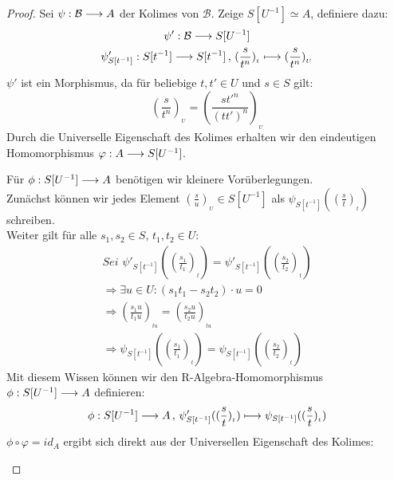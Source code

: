 \documentclass[10pt,a4paper]{report}
\newcommand{\comment}[1]{}
\newcommand{\functionfront}[3]{\nolinebreak{#1:#2 \longrightarrow #3}}
\newcommand{\function}[5]{\nolinebreak{#1:#2 \longrightarrow #3 \, , \, #4 \longmapsto #5}}
\newcommand{\lok}[2]{#1 [#2^{-1}]}
\newcommand{\loke}[3]{(\frac{#1}{#2})_{_{#3}}}
\begin{document}
\begin{proof}
Sei $\functionfront{\psi}{\mathcal{B}}{A}$ der Kolimes von $\mathcal{B}$. Zeige $\lok{S}{U} \simeq A$, definiere dazu:
\begin{gather*}
\functionfront{\psi'}{\mathcal{B}}{\lok{S}{U}}\\
\function{\psi'_{\lok{S}{t}}}{\lok{S}{t}}{\lok{S}{t}}{\loke{s}{t^n}{t}}{\loke{s}{t^n}{U}}
\end{gather*}
$\psi'$ ist ein Morphismus, da für beliebige $t,t' \in U$ und $s \in S$ gilt:
$$\loke{s}{t^n}{U} = \loke{st'^n}{(tt')^n}{U}$$
Durch die Universelle Eigenschaft des Kolimes erhalten wir den eindeutigen Homomorphismus $\functionfront{\varphi}{A}{\lok{S}{U}}$.
\begin{center}
\end{center}
Für $\functionfront{\phi}{S[U^{-1}]}{A}$ benötigen wir kleinere Vorüberlegungen.\\
Zunächst können wir jedes Element $\loke{s}{u}{U} \in \lok{S}{U}$ als $\psi_{\lok{S}{t}}(\loke{s}{t}{t})$ schreiben.\\
\comment{\label{wobei u = t}}
Weiter gilt für alle $s_1,s_2 \in S , \, t_1,t_2 \in U$: 
\begin{align*}
\textit{Sei }\psi'_{\lok{S}{t}}(\loke{s_1}{t_1}{t}) = \psi'_{\lok{S}{t}}(\loke{s_2}{t_2}{t})\\
\Rightarrow  \exists u \in U: (s_1t_1 - s_2t_2) \cdot u = 0\\
\Rightarrow  \loke{s_1u}{t_1u}{tu} = \loke{s_2u}{t_2u}{tu}\\
\Rightarrow  \psi_{\lok{S}{t}}(\loke{s_1}{t_1}{t}) = \psi_{\lok{S}{t}}(\loke{s_2}{t_2}{t})
\end{align*}
Mit diesem Wissen können wir den R-Algebra-Homomorphismus $\functionfront{\phi}{\lok{S}{U}}{A}$ definieren:
\begin{gather*}
\function{\phi}{\lok{S}{U}}{A}{\psi'_{\lok{S}{t}}(\loke{s}{t}{t})}{\psi_{\lok{S}{t}}(\loke{s}{t}{t})}
\end{gather*}
$\phi \circ \varphi = id_A$ ergibt sich direkt aus der Universellen Eigenschaft des Kolimes:
\begin{center}
\begin{tikzcd}

\end{tikzcd}
\end{center}
\end{proof}
\end{document}
